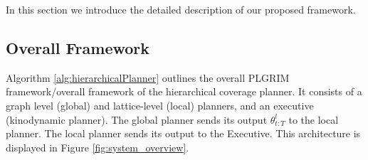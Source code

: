 \documentclass{article}
\begin{document}
In this section we introduce the detailed description of our proposed framework.


    





\subsection{Overall Framework}
Algorithm \ref{alg:hierarchicalPlanner} outlines the overall PLGRIM framework/overall framework of the hierarchical coverage planner. It consists of a graph level (global) and lattice-level (local) planners, and an executive (kinodynamic planner). The global planner sends its output $\theta_{t:T}^l$ to the local planner. The local planner sends its output to the Executive. This architecture is displayed in Figure \ref{fig:system_overview}.
\end{document}
